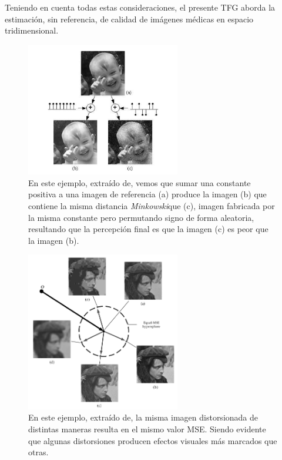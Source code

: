 Teniendo en cuenta todas estas consideraciones, el presente TFG aborda la
estimación, sin referencia, de calidad de imágenes médicas en espacio tridimensional.

\begin{figure}[htp]
  \begin{center}
    \includegraphics[width=0.6\textwidth]{imagenes/chapter2/failure_minkowski_metric.png}
  \end{center}
  \caption[Visualización del problema de la métrica \emph{Minkowski}.]{En este ejemplo, extraído de\cite{MinkowskiFailure},
  vemos que sumar una constante positiva a una imagen  de referencia (a) produce la imagen (b) que contiene la misma distancia \emph{Minkowski}\footnotemark[2]
  que (c), imagen fabricada por la misma constante pero permutando signo de forma aleatoria, resultando que
  la percepción final es que la imagen (c) es peor que la imagen (b).
\label{fig:FailureMinkowskiMetric}}
\end{figure}
\begin{figure}[htp]
  \begin{center}
    \includegraphics[width=0.6\textwidth]{imagenes/chapter2/MSE_Hypersphere.png}
  \end{center}
  \caption[Visualización del hiperplano MSE de imágenes distorsionadas.]{En este ejemplo, extraído de\cite{Wang2006ModernIQ}, la misma imagen distorsionada de distintas maneras resulta en el mismo valor MSE. Siendo evidente que 
algunas distorsiones producen efectos visuales más marcados que otras.}
  \label{fig:MSEHyperSphere}
\end{figure}



